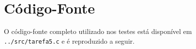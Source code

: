 \documentclass[a4paper,12pt]{article}
\begin{document}
\newpage
\appendix

\section{Código-Fonte}
\label{sec:codigo}

O código-fonte completo utilizado nos testes está disponível em
\texttt{../src/tarefa5.c} e é reproduzido a seguir.


\end{document}
